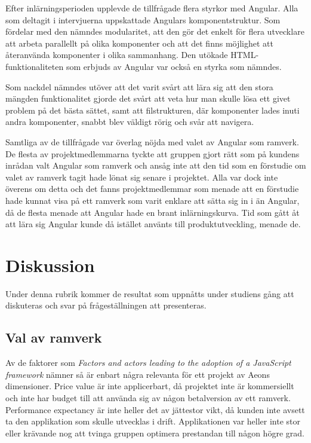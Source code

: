 Efter inlärningsperioden upplevde de tillfrågade flera styrkor med Angular. Alla som deltagit i intervjuerna uppskattade Angulars komponentstruktur. Som fördelar med den nämndes modularitet, att den gör det enkelt för flera utvecklare att arbeta parallellt på olika komponenter och att det finns möjlighet att återanvända komponenter i olika sammanhang. Den utökade HTML-funktionaliteten som erbjuds av Angular var också en styrka som nämndes.

Som nackdel nämndes utöver att det varit svårt att lära sig att den stora mängden funktionalitet gjorde det svårt att veta hur man skulle lösa ett givet problem på det bästa sättet, samt att filstrukturen, där komponenter lades inuti andra komponenter, snabbt blev väldigt rörig och svår att navigera.

Samtliga av de tillfrågade var överlag nöjda med valet av Angular som ramverk. De flesta av projektmedlemmarna tyckte att gruppen gjort rätt som på kundens inrådan valt Angular som ramverk och ansåg inte att den tid som en förstudie om valet av ramverk tagit hade lönat sig senare i projektet. Alla var dock inte överens om detta och det fanns projektmedlemmar som menade att en förstudie hade kunnat visa på ett ramverk som varit enklare att sätta sig in i än Angular, då de flesta menade att Angular hade en brant inlärningskurva. Tid som gått åt att lära sig Angular kunde då istället använts till produktutveckling, menade de.   


\section{Diskussion}

Under denna rubrik kommer de resultat som uppnåtts under studiens gång att diskuteras och svar på frågeställningen att presenteras.

\subsection{Val av ramverk}

Av de faktorer som \textit{Factors and actors leading to the adoption of a JavaScript framework} nämner så är enbart några relevanta för ett projekt av Aeons dimensioner. Price value är inte applicerbart, då projektet inte är kommersiellt och inte har budget till att använda sig av någon betalversion av ett ramverk. Performance expectancy är inte heller det av jättestor vikt, då kunden inte avsett ta den applikation som skulle utvecklas i drift. Applikationen var heller inte stor eller krävande nog att tvinga gruppen optimera prestandan till någon högre grad.

